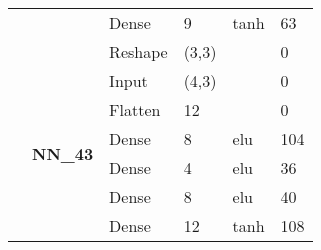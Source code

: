 \begin{table}[H]
\begin{center}
\begin{tabular}{ll|l|l|l|l|}
\multicolumn{1}{|l|}{}                                                                       &                                  & Dense                              & 9                                    & tanh                                     & 63                                          \\ \cline{3-6} 
\multicolumn{1}{|l|}{}                                                                       &                                  & Reshape                            & (3,3)                                &                                          & 0                                           \\ \cline{2-6} 
\multicolumn{1}{|l|}{}                                                                       & \multirow{7}{*}{\textbf{NN\_43}} & Input                              & (4,3)                                &                                          & 0                                           \\ \cline{3-6} 
\multicolumn{1}{|l|}{}                                                                       &                                  & Flatten                            & 12                                   &                                          & 0                                           \\ \cline{3-6} 
\multicolumn{1}{|l|}{}                                                                       &                                  & Dense                              & 8                                    & elu                                     & 104                                         \\ \cline{3-6} 
\multicolumn{1}{|l|}{}                                                                       &                                  & Dense                              & 4                                    & elu                                     & 36                                          \\ \cline{3-6} 
\multicolumn{1}{|l|}{}                                                                       &                                  & Dense                              & 8                                    & elu                                     & 40                                          \\ \cline{3-6} 
\multicolumn{1}{|l|}{}                                                                       &                                  & Dense                              & 12                                   & tanh                                     & 108                                         \\ \cline{3-6} 

\end{tabular}
\end{center}
\end{table}
